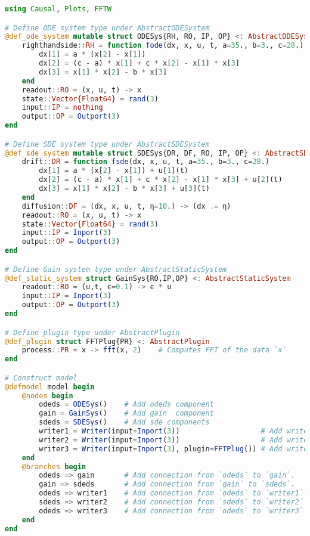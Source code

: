 \appendix 

\begin{lstlisting}[caption={Program using Causal.jl for the simulation of the system in Figure \ref{fig: coupled model}. Plots.jl is used to plot the simulation data while FFTW.jl is used to compute the FFT of the simulation data \cite{plots, fftw}.}, label={lst: coupled codes}, language=Julia]
using Causal, Plots, FFTW

# Define ODE system type under AbstractODESystem
@def_ode_system mutable struct ODESys{RH, RO, IP, OP} <: AbstractODESystem
    righthandside::RH = function fode(dx, x, u, t, a=35., b=3., c=28.)
        dx[1] = a * (x[2] - x[1])
        dx[2] = (c - a) * x[1] + c * x[2] - x[1] * x[3]
        dx[3] = x[1] * x[2] - b * x[3]
    end
    readout::RO = (x, u, t) -> x 
    state::Vector{Float64} = rand(3)
    input::IP = nothing
    output::OP = Outport(3)
end

# Define SDE system type under AbstractSDESystem
@def_sde_system mutable struct SDESys{DR, DF, RO, IP, OP} <: AbstractSDESystem
    drift::DR = function fsde(dx, x, u, t, a=35., b=3., c=28.)
        dx[1] = a * (x[2] - x[1]) + u[1](t)
        dx[2] = (c - a) * x[1] + c * x[2] - x[1] * x[3] + u[2](t)
        dx[3] = x[1] * x[2] - b * x[3] + u[3](t)
    end
    diffusion::DF = (dx, x, u, t, η=10.) -> (dx .= η) 
    readout::RO = (x, u, t) -> x
    state::Vector{Float64} = rand(3)
    input::IP = Inport(3)
    output::OP = Outport(3)
end

# Define Gain system type under AbstractStaticSystem
@def_static_system struct GainSys{RO,IP,OP} <: AbstractStaticSystem 
    readout::RO = (u,t, ϵ=0.1) -> ϵ * u 
    input::IP = Inport(3)
    output::OP = Outport(3)
end 

# Define plugin type under AbstractPlugin
@def_plugin struct FFTPlug{PR} <: AbstractPlugin 
    process::PR = x -> fft(x, 2)    # Computes FFT of the data `x`
end 

# Construct model
@defmodel model begin 
    @nodes begin 
        odeds = ODESys()    # Add odeds component  
        gain = GainSys()    # Add gain  component   
        sdeds = SDESys()    # Add sde components
        writer1 = Writer(input=Inport(3))                   # Add writer without plugin
        writer2 = Writer(input=Inport(3))                   # Add writer without plugin
        writer3 = Writer(input=Inport(3), plugin=FFTPlug()) # Add writer with `FFTPlug` plugin
    end
    @branches begin 
        odeds => gain       # Add connection from `odeds` to `gain`.
        gain => sdeds       # Add connection from `gain` to `sdeds`.
        odeds => writer1    # Add connection from `odeds` to `writer1`.
        sdeds => writer2    # Add connection from `sdeds` to `writer2`.
        odeds => writer3    # Add connection from `odeds` to `writer3`.
    end 
end 


\end{lstlisting}
